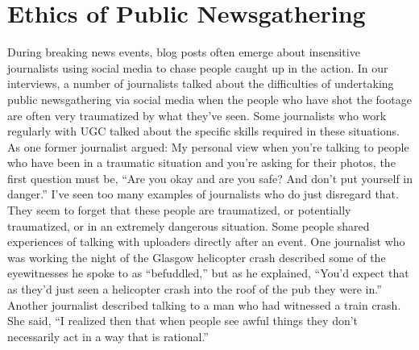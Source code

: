 \documentclass[symmetric, notoc, nobib]{towcenter-book}
\begin{document}
\section{Ethics of Public Newsgathering}
During breaking news events, blog posts often emerge about insensitive
journalists using social media to chase people caught up in the action. In our
interviews, a number of journalists talked about the difficulties of undertaking
public newsgathering via social media when the people who have shot
the footage are often very traumatized by what they've seen. Some journalists
who work regularly with UGC talked about the specific skills required
in these situations. As one former journalist argued:
My personal view when you're talking to people who have been in a
traumatic situation and you're asking for their photos, the first question
must be, ``Are you okay and are you safe? And don't put yourself
in danger.'' I've seen too many examples of journalists who do just disregard
that. They seem to forget that these people are traumatized,
or potentially traumatized, or in an extremely dangerous situation.
Some people shared experiences of talking with uploaders directly after an
event. One journalist who was working the night of the Glasgow helicopter
crash described some of the eyewitnesses he spoke to as ``befuddled,'' but as
he explained, ``You'd expect that as they'd just seen a helicopter crash into
the roof of the pub they were in.'' Another journalist described talking to a
man who had witnessed a train crash. She said, ``I realized then that when
people see awful things they don't necessarily act in a way that is rational.''
\end{document}

